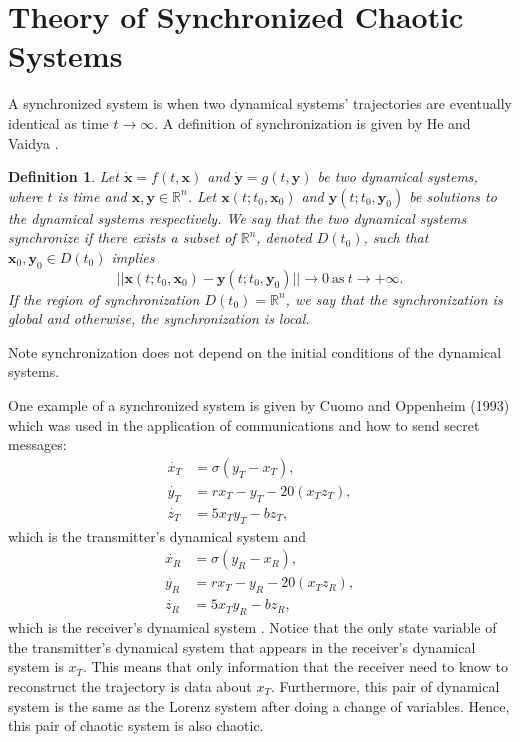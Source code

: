 \documentclass[12pt]{article}
\newtheorem{definition}{Definition}[section]
\begin{document}
    \section{Theory of Synchronized Chaotic Systems}
      A synchronized system is when two dynamical systems' trajectories are eventually identical as time $t \rightarrow \infty$. A definition of synchronization is given by He and Vaidya \cite{he_vaidya_1992}. 
      \begin{definition}
        Let $\dot{\mathbf{x}} = f(t,\mathbf{x})$ and $\dot{\mathbf{y}} = g(t,\mathbf{y})$ be two dynamical systems, where $t$ is time and $\mathbf{x},\mathbf{y} \in \mathbb{R}^n$. Let $\mathbf{x}(t;t_0,\mathbf{x}_0)$ and $\mathbf{y}(t;t_0,\mathbf{y}_0)$ be solutions to the dynamical systems respectively. We say that the two dynamical systems synchronize if there exists a subset of $\mathbb{R}^n$, denoted $D(t_0)$, such that $\mathbf{x}_0,\mathbf{y}_0 \in D(t_0)$ implies 
        \begin{equation*} 
          ||\mathbf{x}(t;t_0,\mathbf{x}_0) - \mathbf{y}(t;t_0,\mathbf{y}_0)|| \rightarrow 0 \ \text{as} \ t \rightarrow +\infty.
        \end{equation*}
        If the region of synchronization $D(t_0) = \mathbb{R}^n$, we say that the synchronization is global and otherwise, the synchronization is local. 
      \end{definition}
      Note synchronization does not depend on the initial conditions of the dynamical systems. 
      
      One example of a synchronized system is given by Cuomo and Oppenheim (1993) which was used in the application of communications and how to send secret messages: 
      \begin{equation}\label{eq:transmitter}
      \begin{aligned}
        \dot{x_T} &= \sigma (y_T-x_T), \\
        \dot{y_T} &= r  x_T - y_T - 20 (x_T   z_T),\\
        \dot{z_T} &= 5 x_T y_T - b  z_T,
      \end{aligned}
    \end{equation} 
    which is the transmitter's dynamical system and 
    \begin{equation}\label{eq:receiver}
      \begin{aligned}
        \dot{x_R} &= \sigma (y_R-x_R), \\
        \dot{y_R} &= r  x_T - y_R - 20 (x_T   z_R),\\
        \dot{z_R} &= 5 x_T y_R - b  z_R,
      \end{aligned}
    \end{equation}
    which is the receiver's dynamical system \cite{cuomo1993}. Notice that the only state variable of the transmitter's dynamical system that appears in the receiver's dynamical system is $x_T$. This means that only information that the receiver need to know to reconstruct the trajectory is data about $x_T$. Furthermore, this pair of dynamical system is the same as the Lorenz system after doing a change of variables. Hence, this pair of chaotic system is also chaotic. 
\end{document}
